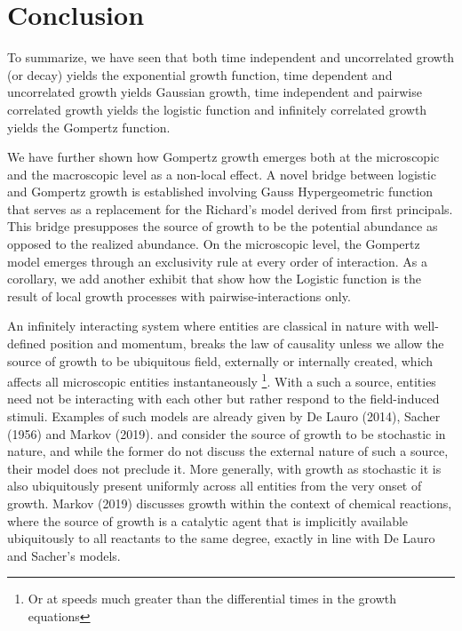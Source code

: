 \documentclass{article}
\begin{document}
\section{Conclusion}
\label{sec:discussion}

To summarize, we have seen that both time independent and uncorrelated growth (or decay) yields the exponential growth function, time dependent and uncorrelated growth yields Gaussian growth, time independent and pairwise correlated growth yields the logistic function and infinitely correlated growth yields the Gompertz function. 

We have further shown how Gompertz growth emerges both at the microscopic and the macroscopic level as a non-local effect. A novel bridge between logistic and Gompertz growth is established involving Gauss Hypergeometric function that serves as a replacement for the Richard's model derived from first principals. This bridge presupposes the source of growth to be the potential abundance as opposed to the realized abundance. On the microscopic level, the Gompertz model emerges through an exclusivity rule at every order of interaction. As a corollary, we add another exhibit that show how the Logistic function is the result of local growth processes with pairwise-interactions only. 

An infinitely interacting system where entities are classical in nature with well-defined position and momentum, breaks the law of causality unless we allow the source of growth to be ubiquitous field, externally or internally created, which affects all microscopic entities instantaneously \footnote{Or at speeds much greater than the differential times in the growth equations}. With a such a source, entities need not be interacting with each other but rather respond to the field-induced stimuli. Examples of such models are already given by De Lauro (2014), Sacher (1956) and Markov (2019). \citet{de2014stochastic} and \citet{sacher1956statistical} consider the source of growth to be stochastic in nature, and while the former do not discuss the external nature of such a source, their model does not preclude it. More generally, with growth as stochastic it is also ubiquitously present uniformly across all entities from the very onset of growth. Markov (2019)\cite{markov2019reaction} discusses growth within the context of chemical reactions, where the source of growth is a catalytic agent that is implicitly available ubiquitously to all reactants to the same degree, exactly in line with De Lauro and Sacher's models. 
\end{document}
